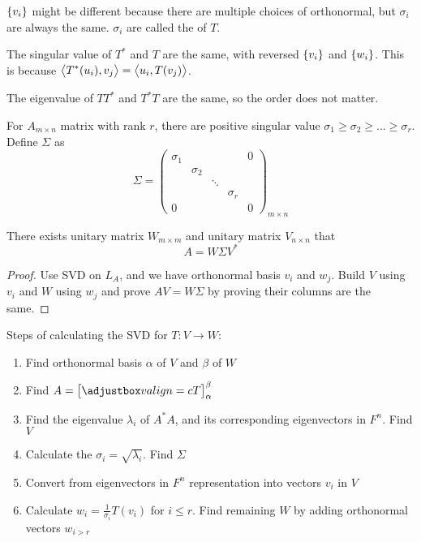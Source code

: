 \begin{definition}
    $\set{v_i}$ might be different because there are multiple choices of orthonormal, but $\sigma_i$ are always the same. $\sigma_i$ are called the  of $T$.
\end{definition}


The singular value of $T^*$ and $T$ are the same, with reversed $\set{v_i}$ and $\set{w_i}$. This is because $\left\langle \displaystyle T^*(u_i), v_j \right\rangle = \left\langle \displaystyle u_i, T(v_j) \right\rangle$.


The eigenvalue of $TT^*$ and $T^*T$ are the same, so the order does not matter.

\begin{theorem}
    For $A_{m \times n}$ matrix with rank $r$, there are positive singular value $\sigma_1 \geq \sigma_2 \geq ... \geq \sigma_r$. Define $\Sigma$ as
    \begin{equation}
        \Sigma = \begin{pmatrix}
            \sigma_1 & & & & 0 \\
             & \sigma_2 \\
             &  & \ddots &  \\
             &  &  &\sigma_r \\
            0 & & &  & 0
        \end{pmatrix}_{m \times n}
    \end{equation}
    
    There exists unitary matrix $W_{m \times m}$ and unitary matrix $V_{n \times n}$ that
    \begin{equation}
        A = W \Sigma V^*
    \end{equation}
\end{theorem}
\begin{proof}
    Use SVD on $L_A$, and we have orthonormal basis $v_i$ and $w_j$. Build $V$ using $v_i$ and $W$ using $w_j$ and prove $AV = W \Sigma$ by proving their columns are the same.
\end{proof}

Steps of calculating the SVD for $T:V \rightarrow W$:
\begin{enumerate}
    \item Find orthonormal basis $\alpha$ of $V$ and $\beta$ of $W$
    \item Find $A = \coordinate{T}_\alpha^\beta$
    \item Find the eigenvalue $\lambda_i$ of $A^*A$, and its corresponding eigenvectors in $F^n$. Find $V$
    \item Calculate the $\sigma_i = \sqrt{\lambda_i}$. Find $\Sigma$
    \item Convert from eigenvectors in $F^n$ representation into vectors $v_i$ in $V$
    \item Calculate $\displaystyle w_i = \frac{1}{\sigma_i} T(v_i)$ for $i \leq r$. Find remaining $W$ by adding orthonormal vectors $w_{i > r}$
\end{enumerate}

